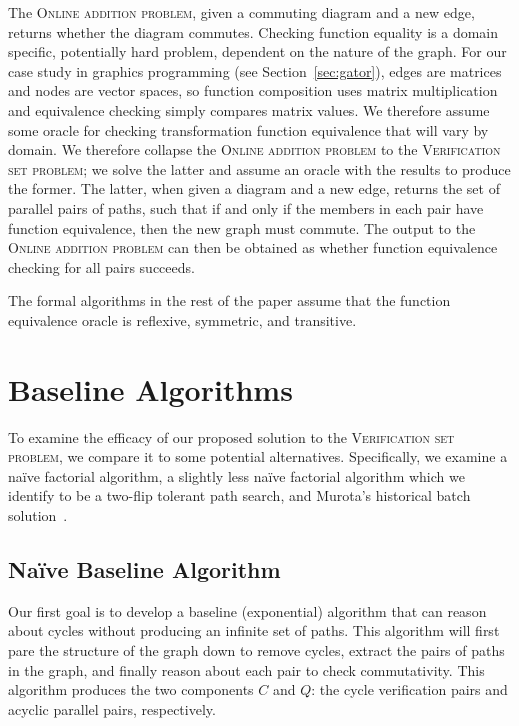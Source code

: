 \documentclass[sigplan,review,nonacm=true]{acmart}
\begin{document}
The \textsc{Online addition problem}, given a commuting diagram and a new edge, returns whether the diagram commutes.
Checking function equality is a domain specific, potentially hard problem, dependent on the nature of the graph.
For our case study in graphics programming (see Section~\ref{sec:gator}), edges are matrices and nodes are vector spaces, so function composition uses matrix multiplication and equivalence checking simply compares matrix values.
We therefore assume some oracle for checking transformation function equivalence that will vary by domain.
%
We therefore collapse the \textsc{Online addition problem} to the \textsc{Verification set problem}; we solve the latter and assume an oracle with the results to produce the former.
The latter, when given a diagram and a new edge, returns the set of parallel pairs of paths, such that if and only if the members in each pair have function equivalence, then the new graph must commute.
The output to the \textsc{Online addition problem} can then be obtained as whether function equivalence checking for all pairs succeeds.

The formal algorithms in the rest of the paper assume that the function equivalence oracle is reflexive, symmetric, and transitive.

\section{Baseline Algorithms}

To examine the efficacy of our proposed solution to the \textsc{Verification set problem}, we compare it to some potential alternatives.
Specifically, we examine a na\"{i}ve factorial algorithm, a slightly less na\"{i}ve factorial algorithm which we identify to be a two-flip tolerant path search, and Murota's historical batch solution~\cite{commutative}.

\subsection{Na\"{i}ve Baseline Algorithm}
Our first goal is to develop a baseline (exponential) algorithm that can reason about cycles without producing an infinite set of paths.  This algorithm will first pare the structure of the graph down to remove cycles, extract the pairs of paths in the graph, and finally reason about each pair to check commutativity.  This algorithm produces the two components $C$ and $Q$: the cycle verification pairs and acyclic parallel pairs, respectively.
\end{document}
